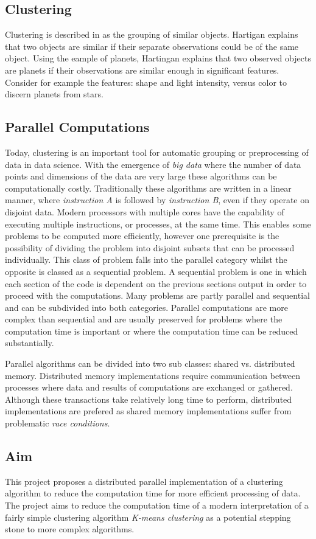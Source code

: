 
\subsection{Clustering}

Clustering is described in \cite{hartigan_intro} as the grouping of similar objects. Hartigan explains that two objects are similar if their separate observations could be of the same object. Using the eample of planets, Hartingan explains that two observed objects are planets if their observations are similar enough in significant features. Consider for example the features: shape and light intensity, versus color to discern planets from stars.

\subsection{Parallel Computations}
Today, clustering is an important tool for automatic grouping or preprocessing of data in data science. With the emergence of \emph{big data} where the number of data points and dimensions of the data are very large these algorithms can be computationally costly. Traditionally these algorithms are written in a linear manner, where \textit{instruction A} is followed by \textit{instruction B}, even if they operate on disjoint data. Modern processors with multiple cores have the capability of executing multiple instructions, or processes, at the same time. This enables some problems to be computed more efficiently, however one prerequisite is the possibility of dividing the problem into disjoint subsets that can be processed individually. This class of problem falls into the parallel category whilst the opposite is classed as a sequential problem. A sequential problem is one in which each section of the code is dependent on the previous sections output in order to proceed with the computations. Many problems are partly parallel and sequential and can be subdivided into both categories. Parallel computations are more complex than sequential and are usually preserved for problems where the computation time is important or where the computation time can be reduced substantially.

Parallel algorithms can be divided into two sub classes: shared vs. distributed memory. Distributed memory implementations require communication between processes where data and results of computations are exchanged or gathered. Although these transactions take relatively long time to perform, distributed implementations are prefered as shared memory implementations suffer from problematic \emph{race conditions}.


\subsection{Aim}
This project proposes a distributed parallel implementation of a clustering algorithm to reduce the computation time for more efficient processing of data. The project aims to reduce the computation time of a modern interpretation of a fairly simple clustering algorithm \emph{K-means clustering} as a potential stepping stone to more complex algorithms.
